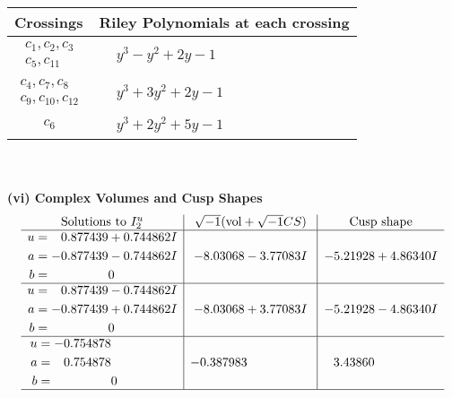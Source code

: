 \documentclass[1p]{elsarticle_modified}
\theoremstyle{definition}
\newcommand{\I}{\sqrt{-1}}
\begin{document}
\begin{tabular}{m{50pt}|m{274pt}}
Crossings & \hspace{64pt}Riley Polynomials at each crossing \\
\hline $$\begin{aligned}c_{1},c_{2},c_{3}\\c_{5},c_{11}\end{aligned}$$&$\begin{aligned}
&y^3- y^2+2 y-1
\end{aligned}$\\
\hline $$\begin{aligned}c_{4},c_{7},c_{8}\\c_{9},c_{10},c_{12}\end{aligned}$$&$\begin{aligned}
&y^3+3 y^2+2 y-1
\end{aligned}$\\
\hline $$\begin{aligned}c_{6}\end{aligned}$$&$\begin{aligned}
&y^3+2 y^2+5 y-1
\end{aligned}$\\
\hline
\end{tabular}\\~\\
\newpage\flushleft \textbf{(vi) Complex Volumes and Cusp Shapes}
$$\begin{array}{c|c|c}  
\text{Solutions to }I^u_{2}& \I (\text{vol} + \sqrt{-1}CS) & \text{Cusp shape}\\
 \hline 
\begin{aligned}
u &= \phantom{-}0.877439 + 0.744862 I \\
a &= -0.877439 - 0.744862 I \\
b &= \phantom{-0.000000 } 0\end{aligned}
 & -8.03068 - 3.77083 I & -5.21928 + 4.86340 I \\ \hline\begin{aligned}
u &= \phantom{-}0.877439 - 0.744862 I \\
a &= -0.877439 + 0.744862 I \\
b &= \phantom{-0.000000 } 0\end{aligned}
 & -8.03068 + 3.77083 I & -5.21928 - 4.86340 I \\ \hline\begin{aligned}
u &= -0.754878\phantom{ +0.000000I} \\
a &= \phantom{-}0.754878\phantom{ +0.000000I} \\
b &= \phantom{-0.000000 } 0\end{aligned}
 & -0.387983\phantom{ +0.000000I} & \phantom{-}3.43860\phantom{ +0.000000I}\\
 \hline 
 \end{array}$$\newpage\newpage\renewcommand{\arraystretch}{1}
\end{document}
